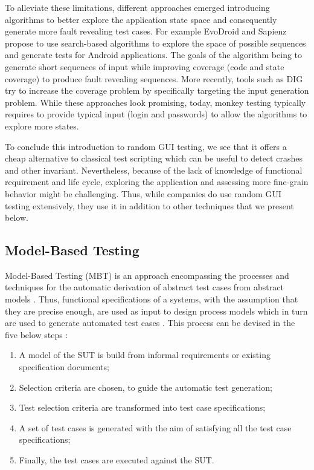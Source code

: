 To alleviate these limitations, different approaches emerged introducing algorithms to better explore the application state space and consequently generate more fault revealing test cases. For example EvoDroid \cite{Mahmood2014} and Sapienz \cite{Mao2016} propose to use search-based algorithms to explore the space of possible sequences and generate tests for Android applications. The goals of the algorithm being to generate short sequences of input while improving coverage (code and state coverage) to produce fault revealing sequences. More recently, tools such as DIG \cite{Biagiola2019} try to increase the coverage problem by specifically targeting the input generation problem. While these approaches look promising, today, monkey testing typically requires to provide typical input (\eg login and passwords) to allow the algorithms to explore more states.

To conclude this introduction to random GUI testing, we see that it offers a cheap alternative to classical test scripting which can be useful to detect crashes and other invariant. Nevertheless, because of the lack of knowledge of functional requirement and life cycle, exploring the application and assessing more fine-grain behavior might be challenging. Thus, while companies do use random GUI testing extensively, they use it in addition to other techniques that we present below.

\subsection{Model-Based Testing}
\label{sec:introduction-model-based-testing}

Model-Based Testing (MBT) is an approach encompassing the processes and techniques for the automatic derivation of abstract test cases from abstract models \cite{Utting2012}. Thus, functional specifications of a systems, with the assumption that they are precise enough, are used as input to design process models which in turn are used to generate automated test cases \cite{Gupta2011}. This process can be devised in the five below steps \cite{Utting2012}:

\begin{enumerate}
    \item A model of the SUT is build from informal requirements or existing specification documents;
    \item Selection criteria are chosen, to guide the automatic test generation;
    \item Test selection criteria are transformed into test case specifications;
    \item A set of test cases is generated with the aim of satisfying all the test case specifications;
    \item Finally, the test cases are executed against the SUT.
\end{enumerate}

